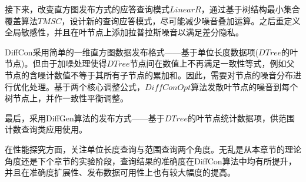接下来，改变直方图发布方式的应答查询模式$LinearR$，通过基于树结构最小集合覆盖算法$TMSC$，设计新的查询应答模式，尽可能减少噪音叠加运算。之后重定义全局敏感性，并且在叶节点上添加拉普拉斯噪音以满足差分隐私。

DiffCon采用简单的一维直方图数据发布格式——基于单位长度数据项($DTree$的叶节点)。但由于加噪处理使得$DTree$节点间在数值上不再满足一致性等式，例如父节点的含噪计数值不等于其所有子节点的累加和。因此，需要对节点的噪音分布进行优化处理。基于两个核心调整公式，$DiffConOpt$算法发散叶节点的噪音到每个树节点上，并作一致性平衡调整。

最后，采用DiffGen算法的发布方式——基于$DTree$的叶节点统计数据项，供范围计数查询类应用使用。

在性能探究方面，关注单位长度查询与范围查询两个角度。无乱是从本章节的理论角度还是下个章节的实验阶段，查询结果的准确度在DiffCon算法中均有所提升，并且在准确度扩展性、发布数据可用性上也有较大幅度的提高。


